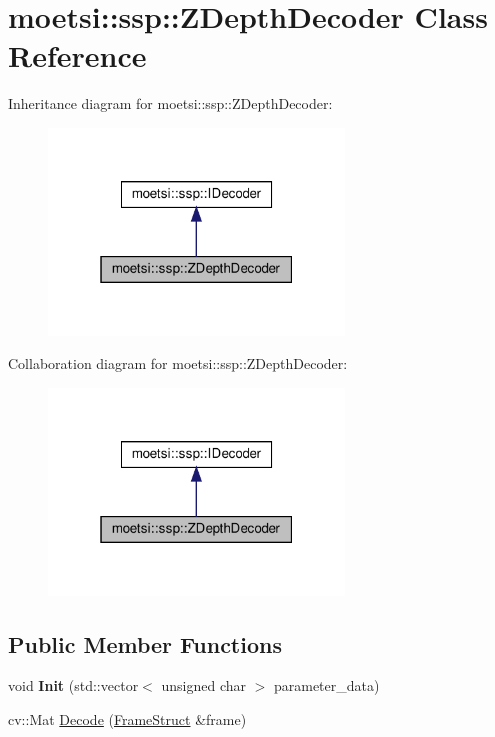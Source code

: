 \hypertarget{classmoetsi_1_1ssp_1_1ZDepthDecoder}{}\section{moetsi\+:\+:ssp\+:\+:Z\+Depth\+Decoder Class Reference}
\label{classmoetsi_1_1ssp_1_1ZDepthDecoder}


Inheritance diagram for moetsi\+:\+:ssp\+:\+:Z\+Depth\+Decoder\+:
\nopagebreak
\begin{figure}[H]
\begin{center}
\leavevmode
\includegraphics[width=223pt]{classmoetsi_1_1ssp_1_1ZDepthDecoder__inherit__graph}
\end{center}
\end{figure}


Collaboration diagram for moetsi\+:\+:ssp\+:\+:Z\+Depth\+Decoder\+:
\nopagebreak
\begin{figure}[H]
\begin{center}
\leavevmode
\includegraphics[width=223pt]{classmoetsi_1_1ssp_1_1ZDepthDecoder__coll__graph}
\end{center}
\end{figure}
\subsection*{Public Member Functions}
\begin{DoxyCompactItemize}
\item 
\mbox{\label{classmoetsi_1_1ssp_1_1ZDepthDecoder_aad7fe4789b709fc3496a1837a8ff86e5}} 
void {\bfseries Init} (std\+::vector$<$ unsigned char $>$ parameter\+\_\+data)
\item 
cv\+::\+Mat \hyperlink{classmoetsi_1_1ssp_1_1ZDepthDecoder_a43226095658d616f7e38df1d43c2f88a}{Decode} (\hyperlink{structmoetsi_1_1ssp_1_1FrameStruct}{Frame\+Struct} \&frame)
\end{DoxyCompactItemize}


